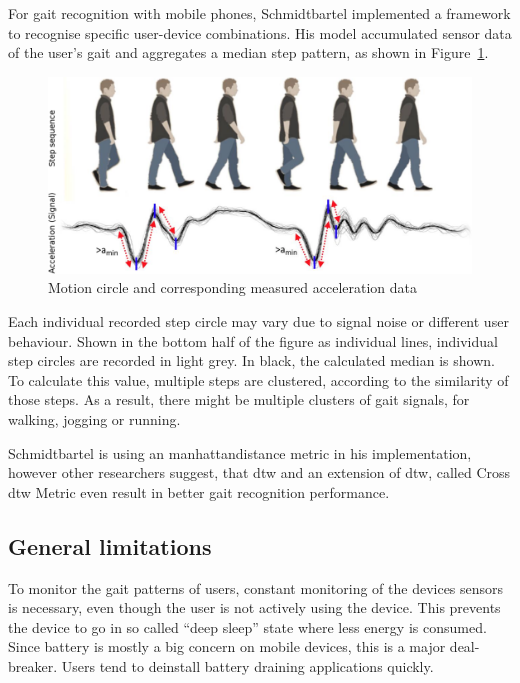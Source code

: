 For gait recognition with mobile phones, Schmidtbartel\cite{thesisschmidbartl} implemented a framework to recognise specific user-device combinations. His model accumulated sensor data of the user's gait and aggregates a median step pattern, as shown in Figure~\ref{fig:gaitacceleration}. 
\begin{figure}
    \centering
    \includegraphics[width=\textwidth]{figures/GaitAcceleration.png}
    \caption{Motion circle and corresponding measured acceleration data\cite{thesisschmidbartl}}
    \label{fig:gaitacceleration}
\end{figure}

Each individual recorded step circle may vary due to signal noise or different user behaviour. Shown in the bottom half of the figure as individual lines, individual step circles are recorded in light grey. In black, the calculated median is shown. To calculate this value, multiple steps are clustered, according to the similarity of those steps. As a result, there might be multiple clusters of gait signals, \ie for walking, jogging or running.

Schmidtbartel is using an \gls{manhattandistance} metric in his implementation, however other researchers\cite{derawi2013gait} suggest, that \gls{dtw} and an extension of \gls{dtw}, called Cross \gls{dtw} Metric even result in better gait recognition performance.

\subsection{General limitations}
To monitor the gait patterns of users, constant monitoring of the devices sensors is necessary, even though the user is not actively using the device. This prevents the device to go in so called ``deep sleep'' state where less energy is consumed. Since battery is mostly a big concern on mobile devices, this is a major deal-breaker. Users tend to deinstall battery draining applications quickly.

